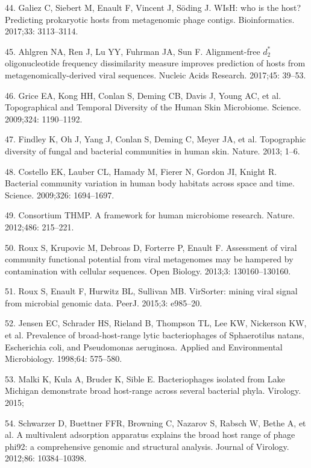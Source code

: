 \documentclass[12pt,]{article}
\begin{document}
\hypertarget{ref-Galiez:2017gm}{}
44. Galiez C, Siebert M, Enault F, Vincent J, Söding J. WIsH: who is the
host? Predicting prokaryotic hosts from metagenomic phage contigs.
Bioinformatics. 2017;33: 3113--3114.

\hypertarget{ref-Ahlgren:2017gh}{}
45. Ahlgren NA, Ren J, Lu YY, Fuhrman JA, Sun F. Alignment-free
\(d_2^*\) oligonucleotide frequency dissimilarity measure improves
prediction of hosts from metagenomically-derived viral sequences.
Nucleic Acids Research. 2017;45: 39--53.

\hypertarget{ref-Grice:2009eea}{}
46. Grice EA, Kong HH, Conlan S, Deming CB, Davis J, Young AC, et al.
Topographical and Temporal Diversity of the Human Skin Microbiome.
Science. 2009;324: 1190--1192.

\hypertarget{ref-Findley:2013jf}{}
47. Findley K, Oh J, Yang J, Conlan S, Deming C, Meyer JA, et al.
Topographic diversity of fungal and bacterial communities in human skin.
Nature. 2013; 1--6.

\hypertarget{ref-Costello:2009im}{}
48. Costello EK, Lauber CL, Hamady M, Fierer N, Gordon JI, Knight R.
Bacterial community variation in human body habitats across space and
time. Science. 2009;326: 1694--1697.

\hypertarget{ref-Consortium:2012iz}{}
49. Consortium THMP. A framework for human microbiome research. Nature.
2012;486: 215--221.

\hypertarget{ref-Roux:2013cr}{}
50. Roux S, Krupovic M, Debroas D, Forterre P, Enault F. Assessment of
viral community functional potential from viral metagenomes may be
hampered by contamination with cellular sequences. Open Biology. 2013;3:
130160--130160.

\hypertarget{ref-Roux:2015dh}{}
51. Roux S, Enault F, Hurwitz BL, Sullivan MB. VirSorter: mining viral
signal from microbial genomic data. PeerJ. 2015;3: e985--20.

\hypertarget{ref-Jensen:1998vh}{}
52. Jensen EC, Schrader HS, Rieland B, Thompson TL, Lee KW, Nickerson
KW, et al. Prevalence of broad-host-range lytic bacteriophages of
Sphaerotilus natans, Escherichia coli, and Pseudomonas aeruginosa.
Applied and Environmental Microbiology. 1998;64: 575--580.

\hypertarget{ref-Malki:2015tm}{}
53. Malki K, Kula A, Bruder K, Sible E. Bacteriophages isolated from
Lake Michigan demonstrate broad host-range across several bacterial
phyla. Virology. 2015;

\hypertarget{ref-Schwarzer:2012ez}{}
54. Schwarzer D, Buettner FFR, Browning C, Nazarov S, Rabsch W, Bethe A,
et al. A multivalent adsorption apparatus explains the broad host range
of phage phi92: a comprehensive genomic and structural analysis. Journal
of Virology. 2012;86: 10384--10398.
\end{document}
